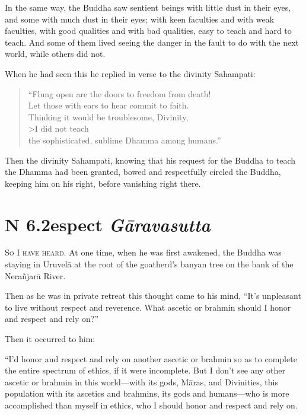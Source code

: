\documentclass[12pt,openany]{book}%
\newcommand*{\suttatitleacronym}[1]{\smaller[2]{#1}\vspace*{.3em}}
\newcommand*{\suttatitletranslation}[1]{\linebreak{#1}}
\newcommand*{\suttatitleroot}[1]{\linebreak\smaller[2]\itshape{#1}}
\newcommand*{\tocacronym}[1]{\hspace*{-3.3em}{#1}\quad}
\newcommand*{\toctranslation}[1]{#1}
\newcommand*{\tocroot}[1]{(\textit{#1})}
\newcommand*{\scevam}[1]{\textsc{#1}}
\begin{document}
In the same way, the Buddha saw sentient beings with little dust in their eyes, and some with much dust in their eyes; with keen faculties and with weak faculties, with good qualities and with bad qualities, easy to teach and hard to teach. And some of them lived seeing the danger in the fault to do with the next world, while others did not. 

When he had seen this he replied in verse to the divinity Sahampati: 

\begin{verse}%
“Flung open are the doors to freedom from death! \\
Let those with ears to hear commit to faith. \\
Thinking it would be troublesome, Divinity, \\>I did not teach \\
the sophisticated, sublime Dhamma among humans.” 

%
\end{verse}

Then the divinity Sahampati, knowing that his request for the Buddha to teach the Dhamma had been granted, bowed and respectfully circled the Buddha, keeping him on his right, before vanishing right there. 

%
\section*{{\suttatitleacronym SN 6.2}{\suttatitletranslation Respect }{\suttatitleroot Gāravasutta}}
\addcontentsline{toc}{section}{\tocacronym{SN 6.2} \toctranslation{Respect } \tocroot{Gāravasutta}}

\scevam{So I have heard. }At one time, when he was first awakened, the Buddha was staying in \textsanskrit{Uruvelā} at the root of the goatherd’s banyan tree on the bank of the \textsanskrit{Nerañjarā} River. 

Then as he was in private retreat this thought came to his mind, “It’s unpleasant to live without respect and reverence. What ascetic or brahmin should I honor and respect and rely on?” 

Then it occurred to him: 

“I’d honor and respect and rely on another ascetic or brahmin so as to complete the entire spectrum of ethics, if it were incomplete. But I don’t see any other ascetic or brahmin in this world—with its gods, \textsanskrit{Māras}, and Divinities, this population with its ascetics and brahmins, its gods and humans—who is more accomplished than myself in ethics, who I should honor and respect and rely on. 
\end{document}
